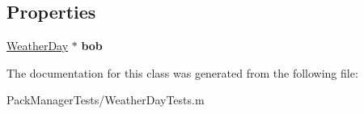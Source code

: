 \subsection*{Properties}
\begin{DoxyCompactItemize}
\item 
\hypertarget{interface_weather_day_tests_ae4e4eff53593310d4bde8acdfba86ce1}{\hyperlink{interface_weather_day}{Weather\-Day} $\ast$ {\bfseries bob}}\label{interface_weather_day_tests_ae4e4eff53593310d4bde8acdfba86ce1}

\end{DoxyCompactItemize}


The documentation for this class was generated from the following file\-:\begin{DoxyCompactItemize}
\item 
Pack\-Manager\-Tests/Weather\-Day\-Tests.\-m\end{DoxyCompactItemize}
